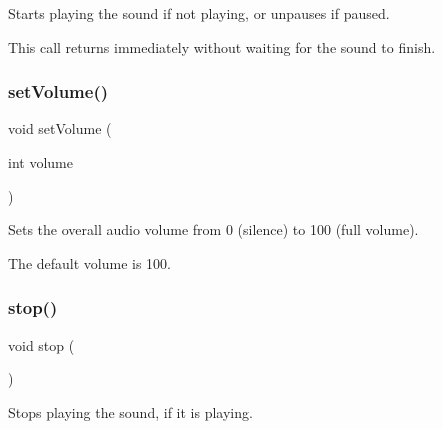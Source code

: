 Starts playing the sound if not playing, or unpauses if paused. 

This call returns immediately without waiting for the sound to finish. \mbox{\label{classsgl_1_1GSound_a6715d5315d47c73b3838f2cb771e7b58}} 
\subsubsection{\texorpdfstring{set\+Volume()}{setVolume()}}
{\footnotesize\ttfamily void set\+Volume (\begin{DoxyParamCaption}\item[{int}]{volume }\end{DoxyParamCaption})\hspace{0.3cm}{\ttfamily [static]}}



Sets the overall audio volume from 0 (silence) to 100 (full volume). 

The default volume is 100. \mbox{\label{classsgl_1_1GSound_a8c528baf37154d347366083f0f816846}} 
\subsubsection{\texorpdfstring{stop()}{stop()}}
{\footnotesize\ttfamily void stop (\begin{DoxyParamCaption}{ }\end{DoxyParamCaption})\hspace{0.3cm}{\ttfamily [static]}}



Stops playing the sound, if it is playing. 

